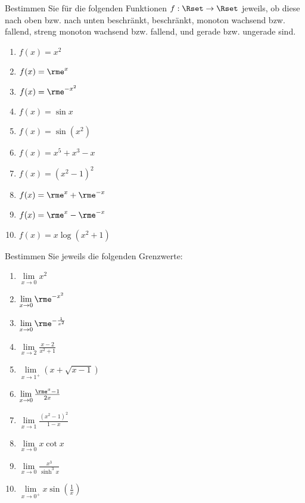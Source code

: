 
Bestimmen Sie für die folgenden Funktionen $f:\Rset\to\Rset$ jeweils, ob diese nach oben bzw. nach unten beschränkt, beschränkt, monoton wachsend bzw. fallend, streng monoton wachsend bzw. fallend, und gerade bzw. ungerade sind.\\
\parbox{0.4\textwidth}{\begin{enumerate}
\item $f(x)=x^2$
\item $f(x)=\rme^x$
\item $f(x)=\rme^{-x^2}$
\item $f(x)=\sin x$
\item $f(x)=\sin (x^2)$
\end{enumerate}}\parbox{0.6\textwidth}{\begin{enumerate}\setcounter{enumi}{5}
\item $f(x)=x^5+x^3-x$
\item $f(x)=(x^2-1)^2$
\item $f(x)=\rme^x+\rme^{-x}$
\item $f(x)=\rme^x-\rme^{-x}$
\item $f(x)=x\log(x^2+1)$
\end{enumerate}}




Bestimmen Sie jeweils die folgenden Grenzwerte:\\
\parbox{0.5\textwidth}{\begin{enumerate}
\item $\lim\limits_{x\to 0} x^2$
\item $\lim\limits_{x\to 0} \rme^{-x^2}$
\item $\lim\limits_{x\to 0} \rme^{-\frac{1}{x^2}}$
\item $\lim\limits_{x\to 2} \frac{x-2}{x^2+1}$
\item $\lim\limits_{x\to 1^+} \left(x+\sqrt{x-1}\right)$
\end{enumerate}}\parbox{0.5\textwidth}{\begin{enumerate}\setcounter{enumi}{5}
\item $\lim\limits_{x\to 0} \frac{\rme^x-1}{2x}$
\item $\lim\limits_{x\to 1} \frac{(x^2-1)^2}{1-x}$
\item $\lim\limits_{x\to 0} x\cot x$
\item $\lim\limits_{x\to 0} \frac{x^3}{\sinh^3 x}$
\item $\lim\limits_{x\to 0^+} x\sin\left(\frac{1}{x}\right)$
\end{enumerate}}



